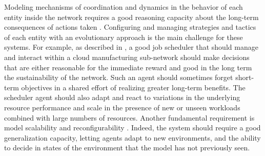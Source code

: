 Modeling mechanisms of coordination and dynamics in the behavior of each entity inside the network requires a good reasoning capacity about the long-term consequences of actions taken \parencite{guizzi_integrating_2013}. Configuring and managing strategies and tactics of each entity with an evolutionary approach is the main challenge for these systems. For example, as described in \textcite{haj2019view}, a good job scheduler that should manage and interact within a cloud manufacturing sub-network should make decisions that are either reasonable for the immediate reward and good in the long term the sustainability of the network. Such an agent should sometimes forget short-term objectives in a shared effort of realizing greater long-term benefits. The scheduler agent should also adapt and react to variations in the underlying resource performance and scale in the presence of new or unseen workloads combined with large numbers of resources. Another fundamental requirement is model scalability and reconfigurability \parencite{putnik_scalability_2013}. Indeed, the system should require a good generalization capacity, letting agents adapt to new environments, and the ability to decide in states of the environment that the model has not previously seen.
